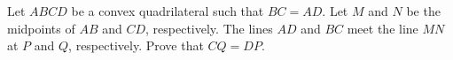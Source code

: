 Let $ABCD$ be a convex quadrilateral such that $BC=AD$. Let $M$ and $N$ be the midpoints of $AB$ and $CD$,  respectively. The lines $AD$ and $BC$ meet the line $MN$ at $P$ and $Q$,  respectively. Prove that $CQ=DP$.